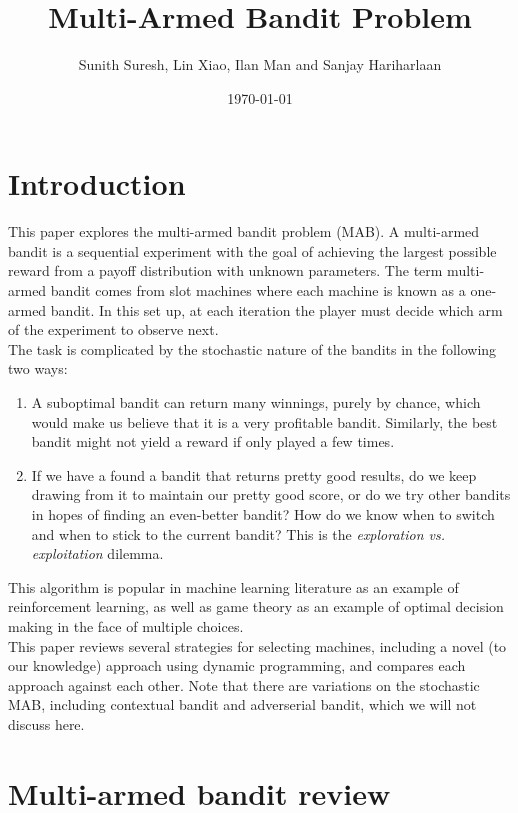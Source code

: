 \documentclass{article}
\title{Multi-Armed Bandit Problem}
\author{Sunith Suresh, Lin Xiao, Ilan Man and Sanjay Hariharlaan}
\date{\today}
\begin{document}
\maketitle

\section{Introduction}

This paper explores the multi-armed bandit problem (MAB). A multi-armed bandit is a sequential experiment with the goal of achieving the largest possible reward from a payoff distribution with unknown parameters. The term multi-armed bandit comes from slot machines where each machine is known as a one-armed bandit. In this set up, at each iteration the player must decide which arm of the experiment to observe next.\\

The task is complicated by the stochastic nature of the bandits in the following two ways:

\begin{enumerate}
\item A suboptimal bandit can return many winnings, purely by chance, which would make us believe that it is a very profitable bandit. Similarly, the best bandit might not yield a reward if only played a few times.
\item If we have a found a bandit that returns pretty good results, do we keep drawing from it to maintain our pretty good score, or do we try other bandits in hopes of finding an even-better bandit? How do we know when to switch and when to stick to the current bandit? This is the \textit{exploration vs. exploitation} dilemma.
\end{enumerate}

This algorithm is popular in machine learning literature as an example of reinforcement learning, as well as game theory as an example of optimal decision making in the face of multiple choices.\\

This paper reviews several strategies for selecting machines, including a novel (to our knowledge) approach using dynamic programming, and compares each approach against each other. Note that there are variations on the stochastic MAB, including contextual bandit and adverserial bandit, which we will not discuss here.

\section{Multi-armed bandit review}
\end{document}
